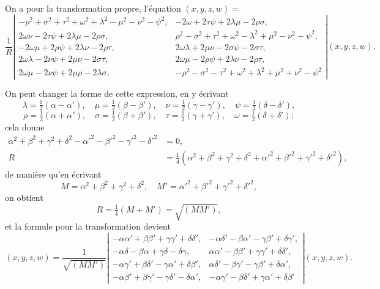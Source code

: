\documentclass[11pt,a4paper]{article}
\begin{document}
On a pour la transformation propre, l'\'equation $(x, y, z, w) =$
\[
\frac{1}{R}\left\lvert\begin{array}{cccc}
-\rho^2 + \sigma^2 + \tau^2 + \omega^2 + \lambda^2 - \mu^2 - \nu^2 - \psi^2,& -2\omega + 2\tau\psi + 2\lambda\mu - 2\rho\sigma,\\
2\omega\nu - 2\tau\psi + 2\lambda\mu - 2\rho\sigma,& \rho^2 - \sigma^2 + \tau^2 + \omega^2 - \lambda^2 + \mu^2 - \nu^2 - \psi^2,\\
- 2\omega\mu + 2\rho\psi + 2\lambda\nu - 2\rho\tau,& 2\omega\lambda + 2\mu\nu - 2\sigma\psi - 2\sigma\tau,\\
2\omega\lambda - 2\nu\psi + 2\mu\nu - 2\sigma\tau, & 2\omega\mu - 2\rho\psi + 2\lambda\nu - 2\rho\tau,\\
2\omega\mu - 2\nu\psi + 2\mu\rho - 2\lambda\sigma,& -\rho^2 - \sigma^2 - \tau^2 + \omega^2 + \lambda^2 + \mu^2 + \nu^2 - \psi^2
\end{array}\right\rvert (x, y, z, w).
\]

\medskip

On peut changer la forme de cette expression, en y \'ecrivant
\[
\lambda = \tfrac{1}{2}(\alpha - \alpha'),\quad \mu = \tfrac{1}{2}(\beta - \beta'),\quad \nu = \tfrac{1}{2}(\gamma - \gamma'),\quad \psi = \tfrac{1}{2}(\delta - \delta'),
\]
\[
\rho = \tfrac{1}{2}(\alpha + \alpha'),\quad \sigma = \tfrac{1}{2}(\beta + \beta'),\quad \tau = \tfrac{1}{2}(\gamma + \gamma'),\quad \omega = \tfrac{1}{2}(\delta + \delta');
\]
cela donne
\begin{align*}
\alpha^2 + \beta^2 + \gamma^2 + \delta^2 - \alpha'^2 - \beta'^2 - \gamma'^2 - \delta'^2 &= 0,\\
R &= \tfrac{1}{4}(\alpha^2 + \beta^2 + \gamma^2 + \delta^2 + \alpha'^2 + \beta'^2 + \gamma'^2 + \delta'^2),
\end{align*}
de mani\`ere qu'en \'ecrivant
\[
M = \alpha^2 + \beta^2 + \gamma^2 + \delta^2,\quad M' = \alpha'^2 + \beta'^2 + \gamma'^2 + \delta'^2,
\]
on obtient
\[
R = \tfrac{1}{4}(M + M') = \sqrt{(MM')},
\]
et la formule pour la transformation devient
\[
(x, y, z, w) = \frac{1}{\sqrt{(MM')}}\left\lvert\begin{array}{cccc}
-\alpha\alpha' + \beta\beta' + \gamma\gamma' + \delta\delta',& -\alpha\delta' - \beta\alpha' - \gamma\beta' + \delta\gamma',\\
-\alpha\delta - \beta\alpha + \gamma\delta - \delta\gamma,& \alpha\alpha' - \beta\beta' + \gamma\gamma' + \delta\delta',\\
-\alpha\gamma' + \beta\delta' - \gamma\alpha' + \delta\beta',& \alpha\delta' - \beta\gamma' - \gamma\beta' + \delta\alpha',\\
-\alpha\beta' + \beta\gamma' - \gamma\delta' - \delta\alpha',& -\alpha\gamma' - \beta\delta' + \gamma\alpha' + \delta\beta'
\end{array}\right\rvert (x, y, z, w).
\]
\end{document}
